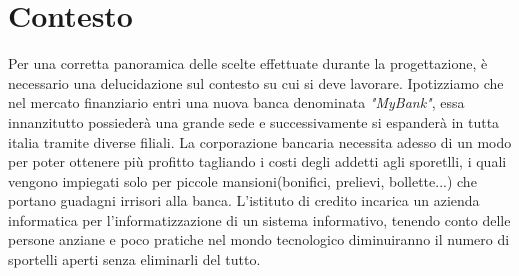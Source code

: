 \section{Contesto}
Per una corretta panoramica delle scelte effettuate durante la progettazione, è necessario una delucidazione sul contesto su cui si deve lavorare.
Ipotizziamo che nel mercato finanziario entri una nuova banca denominata \textit{"MyBank"}, essa innanzitutto possiederà una grande sede e successivamente si espanderà in tutta italia tramite diverse filiali.
La corporazione bancaria necessita adesso di un modo per poter ottenere più profitto tagliando i costi degli addetti agli sporetlli, i quali vengono impiegati solo per piccole mansioni(bonifici, prelievi, bollette...) che portano guadagni irrisori alla banca.
L'istituto di credito incarica un azienda informatica per l'informatizzazione di un sistema informativo, tenendo conto delle persone anziane e poco pratiche nel mondo tecnologico diminuiranno il numero di sportelli aperti senza eliminarli del tutto.
